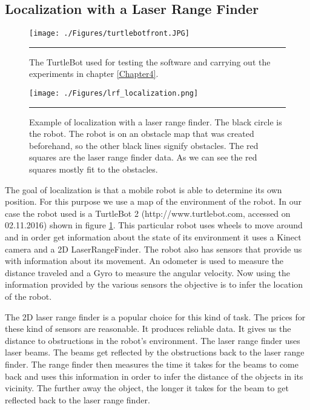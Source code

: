 \subsection{Localization with a Laser Range Finder}
\begin{figure}[htbp]
	\centering
		\texttt{[image: ./Figures/turtlebotfront.JPG]}
		\rule{35em}{0.5pt}
	\caption[TurtleBot]{The TurtleBot used for testing the software and carrying out the experiments in chapter \ref{Chapter4}.}
	\label{fig:turtlebot2}
\end{figure}
\begin{figure}[htbp]
	\centering
		\texttt{[image: ./Figures/lrf\_localization.png]}
		\rule{35em}{0.5pt}
	\caption[Example of localization with laser range finder]{Example of localization with a laser range finder. The black circle is the robot. The robot is on an obstacle map that was created beforehand, so the other black lines signify obstacles. The red squares are the laser range finder data. As we can see the red squares mostly fit to the obstacles.}
	\label{fig:laser_range_finder}
\end{figure}
The goal of localization is that a mobile robot is able to determine its own position. For this purpose we use a map of the environment of the robot. In our case the robot used is a TurtleBot 2 (http://www.turtlebot.com, accessed on 02.11.2016) shown in figure \ref{fig:turtlebot2}. This particular robot uses wheels to move around and in order get information about the state of its environment it uses a Kinect camera \citep{ece21221} and a 2D \gls{LaserRangeFinder}. The robot also has sensors that provide us with information about its movement. An odometer is used to measure the distance traveled and a \gls{Gyro} to measure the angular velocity. Now using the information provided by the various sensors the objective is to infer the location of the robot. 

The 2D laser range finder is a popular choice for this kind of task. The prices for these kind of sensors are reasonable. It produces reliable data. It gives us the distance to obstructions in the robot's environment. The laser range finder uses laser beams. The beams get reflected by the obstructions back to the laser range finder. The range finder then measures the time it takes for the beams to come back and uses this information in order to infer the distance of the objects in its vicinity. The further away the object, the longer it takes for the beam to get reflected back to the laser range finder. 


